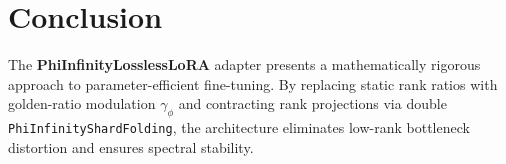 \section{Conclusion}
The \textbf{PhiInfinityLosslessLoRA} adapter presents a mathematically rigorous approach to parameter-efficient fine-tuning. By replacing static rank ratios with golden-ratio modulation $\gamma_{\phi}$ and contracting rank projections via double \texttt{PhiInfinityShardFolding}, the architecture eliminates low-rank bottleneck distortion and ensures spectral stability.